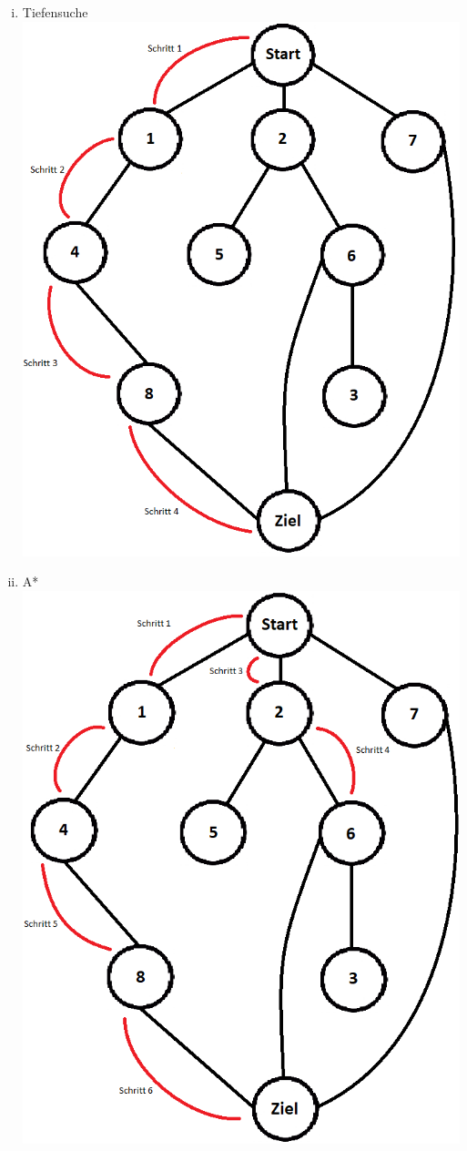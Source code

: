\documentclass[fleqn]{scrartcl}
\begin{document}
\begin{enumerate}[a)]
\begin{enumerate}[i.]
\item Tiefensuche\\
\includegraphics[width=\linewidth]{pictures/depth-first-search.png}
\item A*\\
\includegraphics[width=\linewidth]{pictures/a-star-search.png}

\end{enumerate}
\end{enumerate}
\end{document}
